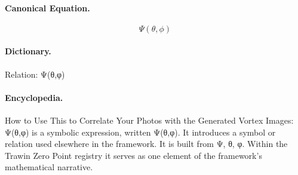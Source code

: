 \paragraph{Canonical Equation.}
\[
\Psi(\theta,\phi)
\]

\paragraph{Dictionary.}
Relation: Ψ(θ,φ)

\paragraph{Encyclopedia.}
How to Use This to Correlate Your Photos with the Generated Vortex Images: Ψ(θ,φ) is a symbolic expression, written Ψ(θ,φ). It introduces a symbol or relation used elsewhere in the framework. It is built from Ψ, θ, φ. Within the Trawin Zero Point registry it serves as one element of the framework's mathematical narrative.

